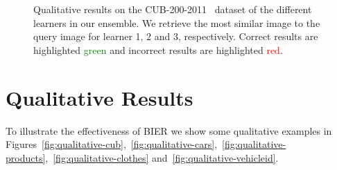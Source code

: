 \documentclass[10pt,journal,compsoc]{IEEEtran}
\begin{document}
\begin{figure*}[htbp]
\begin{center}
    \end{center}

    \caption{Qualitative results on the CUB-200-2011~\cite{WahCUB_200_2011} dataset of the different learners in our ensemble. 
             We retrieve the most similar image to the query image for learner 1, 2 and 3, respectively.
             Correct results are highlighted \textcolor{green}{green} and incorrect results are highlighted \textcolor{red}{red}.}
    \label{fig:qualitative-cub-learners}
\end{figure*}\section{Qualitative Results}\label{sec:qualitative-results}

To illustrate the effectiveness of \ac{BIER} we show some qualitative examples in Figures~\ref{fig:qualitative-cub},~\ref{fig:qualitative-cars},~\ref{fig:qualitative-products},~\ref{fig:qualitative-clothes} and~\ref{fig:qualitative-vehicleid}.
\end{document}
